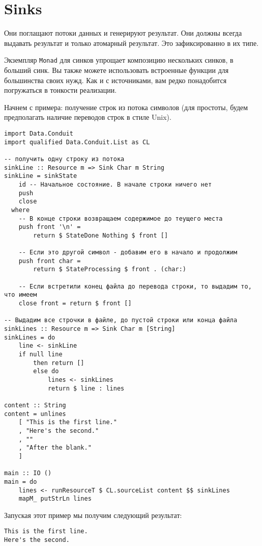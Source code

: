 \section{Sinks}

Они поглащают потоки данных и генерируют результат. Они должны всегда выдавать результат
и только атомарный результат. Это зафиксированно в их типе.

Экземпляр \lstinline=Monad= для синков упрощает композицию нескольких синков, в больший
синк. Вы также
можете использовать встроенные функции для большинства своих нужд. Как и с источниками,
вам редко понадобится погружаться в тонкости реализации. 

Начнем с примера:
получение строк из потока символов (для простоты, будем предполагать наличие переводов
строк в стиле Unix).

\begin{lstlisting}
import Data.Conduit
import qualified Data.Conduit.List as CL

-- получить одну строку из потока
sinkLine :: Resource m => Sink Char m String
sinkLine = sinkState
    id -- Начальное состояние. В начале строки ничего нет
    push
    close
  where
    -- В конце строки возвращаем содержимое до теущего места
    push front '\n' =
        return $ StateDone Nothing $ front []

    -- Если это другой символ - добавим его в начало и продолжим
    push front char =
        return $ StateProcessing $ front . (char:)

    -- Если встретили конец файла до перевода строки, то выдадим то, что имеем
    close front = return $ front []

-- Выдадим все строчки в файле, до пустой строки или конца файла
sinkLines :: Resource m => Sink Char m [String]
sinkLines = do
    line <- sinkLine
    if null line
        then return []
        else do
            lines <- sinkLines
            return $ line : lines

content :: String
content = unlines
    [ "This is the first line."
    , "Here's the second."
    , ""
    , "After the blank."
    ]

main :: IO ()
main = do
    lines <- runResourceT $ CL.sourceList content $$ sinkLines
    mapM_ putStrLn lines
\end{lstlisting}
Запуская этот пример мы получим следующий результат:
\begin{verbatim}
This is the first line.
Here's the second.
\end{verbatim}


